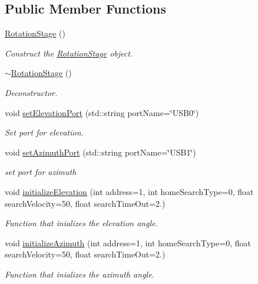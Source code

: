 \subsection*{Public Member Functions}
\begin{DoxyCompactItemize}
\item 
\hyperlink{class_rotation_stage_a14ae00fd0137138b8fa3c653498d13e9}{Rotation\+Stage} ()
\begin{DoxyCompactList}\small\item\em Construct the \hyperlink{class_rotation_stage}{Rotation\+Stage} object. \end{DoxyCompactList}\item 
\hyperlink{class_rotation_stage_a3023bae2d8de9f084036de453d8ac374}{$\sim$\+Rotation\+Stage} ()
\begin{DoxyCompactList}\small\item\em Deconstructor. \end{DoxyCompactList}\item 
void \hyperlink{class_rotation_stage_ab3e4f47bdb09f91c7c85a0fb8fc05e4b}{set\+Elevation\+Port} (std\+::string port\+Name=\char`\"{}U\+S\+B0\char`\"{})
\begin{DoxyCompactList}\small\item\em Set port for elevation. \end{DoxyCompactList}\item 
void \hyperlink{class_rotation_stage_a4fda0b9c1b8a4d6322aa48c5313a55a8}{set\+Azimuth\+Port} (std\+::string port\+Name=\char`\"{}U\+S\+B1\char`\"{})
\begin{DoxyCompactList}\small\item\em set port for azimuth \end{DoxyCompactList}\item 
void \hyperlink{class_rotation_stage_a462d2b21903430d7dfcf5fad97555195}{initialize\+Elevation} (int address=1, int home\+Search\+Type=0, float search\+Velocity=50, float search\+Time\+Out=2.)
\begin{DoxyCompactList}\small\item\em Function that inializes the elevation angle. \end{DoxyCompactList}\item 
void \hyperlink{class_rotation_stage_ac1cf704b7d45ea9e1da654997d93daf7}{initialize\+Azimuth} (int address=1, int home\+Search\+Type=0, float search\+Velocity=50, float search\+Time\+Out=2.)
\begin{DoxyCompactList}\small\item\em Function that inializes the azimuth angle. \end{DoxyCompactList}\item 

\end{DoxyCompactItemize}
